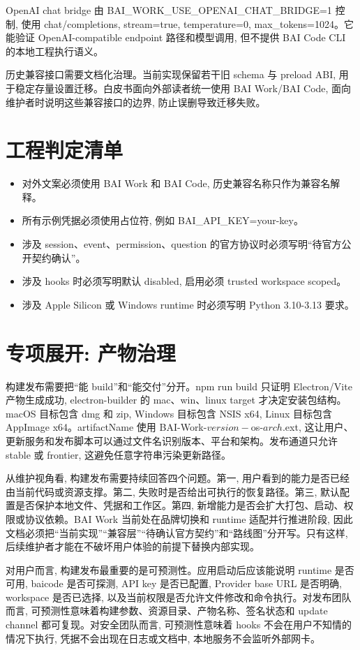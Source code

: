 OpenAI chat bridge 由 BAI\_WORK\_USE\_OPENAI\_CHAT\_BRIDGE=1 控制, 使用 chat/completions, stream=true, temperature=0, max\_tokens=1024。它能验证 OpenAI-compatible endpoint 路径和模型调用, 但不提供 BAI Code CLI 的本地工程执行语义。

历史兼容接口需要文档化治理。当前实现保留若干旧 schema 与 preload ABI, 用于稳定存量设置迁移。白皮书面向外部读者统一使用 BAI Work/BAI Code, 面向维护者时说明这些兼容接口的边界, 防止误删导致迁移失败。

\section{工程判定清单}
\begin{itemize}
  \item 对外文案必须使用 BAI Work 和 BAI Code, 历史兼容名称只作为兼容名解释。
  \item 所有示例凭据必须使用占位符, 例如 BAI\_API\_KEY=your-key。
  \item 涉及 session、event、permission、question 的官方协议时必须写明“待官方公开契约确认”。
  \item 涉及 hooks 时必须写明默认 disabled, 启用必须 trusted workspace scoped。
  \item 涉及 Apple Silicon 或 Windows runtime 时必须写明 Python 3.10-3.13 要求。
\end{itemize}

\section{专项展开: 产物治理}
构建发布需要把“能 build”和“能交付”分开。npm run build 只证明 Electron/Vite 产物生成成功, electron-builder 的 mac、win、linux target 才决定安装包结构。macOS 目标包含 dmg 和 zip, Windows 目标包含 NSIS x64, Linux 目标包含 AppImage x64。artifactName 使用 BAI-Work-${version}-${os}-${arch}.${ext}, 这让用户、更新服务和发布脚本可以通过文件名识别版本、平台和架构。发布通道只允许 stable 或 frontier, 这避免任意字符串污染更新路径。

从维护视角看, 构建发布需要持续回答四个问题。第一, 用户看到的能力是否已经由当前代码或资源支撑。第二, 失败时是否给出可执行的恢复路径。第三, 默认配置是否保护本地文件、凭据和工作区。第四, 新增能力是否会扩大打包、启动、权限或协议依赖。BAI Work 当前处在品牌切换和 runtime 适配并行推进阶段, 因此文档必须把“当前实现”“兼容层”“待确认官方契约”和“路线图”分开写。只有这样, 后续维护者才能在不破坏用户体验的前提下替换内部实现。

对用户而言, 构建发布最重要的是可预测性。应用启动后应该能说明 runtime 是否可用, baicode 是否可探测, API key 是否已配置, Provider base URL 是否明确, workspace 是否已选择, 以及当前权限是否允许文件修改和命令执行。对发布团队而言, 可预测性意味着构建参数、资源目录、产物名称、签名状态和 update channel 都可复现。对安全团队而言, 可预测性意味着 hooks 不会在用户不知情的情况下执行, 凭据不会出现在日志或文档中, 本地服务不会监听外部网卡。


